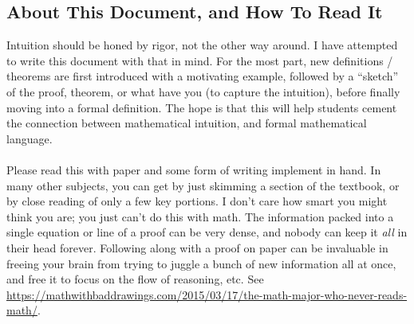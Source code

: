 \documentclass[10pt]{article}
\theoremstyle{definition}
\begin{document}
{\subsection{About This Document, and How To Read It}
Intuition should be honed by rigor, not the other way around.  I have
attempted to write this document with that in mind.  For the most
part, new definitions / theorems are first introduced with a motivating
example, followed by a ``sketch'' of the proof, theorem, or what have
you (to capture the intuition), before finally moving into a formal
definition.  The hope is that this will help students cement the
connection between mathematical intuition, and formal mathematical
language.\\~\\
Please read this with paper and some form of writing implement in
hand.  In many other subjects, you can get by just skimming a section
of the textbook, or by close reading of only a few key portions.  I
don't care how smart you might think you are; you just can't do this
with math.  The information packed into a single equation or line of a
proof can be very dense, and nobody can keep it \emph{all} in their
head forever.  Following along with a proof on paper can be invaluable
in freeing your brain from trying to juggle a bunch of new information
all at once, and free it to focus on the flow of reasoning, etc. See
\url{https://mathwithbaddrawings.com/2015/03/17/the-math-major-who-never-reads-math/}.
}
\end{document}
